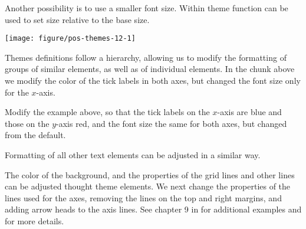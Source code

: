 \documentclass[krantz2]{krantz}\usepackage{knitr}%
\begin{document}
Another possibility is to use a smaller font size. Within theme function  can be used to set size relative to the base size.

\begin{knitrout}\footnotesize
{}\color{fgcolor}\begin{kframe}
\begin{alltt}
  \hlopt{+}  \hlopt{+}
  \hlstd{()} \hlopt{+}
  \hlstd{(} \hlopt{::}\hlstd{(} \hlstd{=} \hlstd{))} \hlopt{+}
  \hlstd{(} \hlstd{=} \hlstd{(} \hlstd{=} \hlstd{),}
         \hlstd{=} \hlstd{(} \hlstd{=} \hlstd{(}\hlstd{)))}
\end{alltt}
\end{kframe}

{\centering \texttt{[image: figure/pos-themes-12-1]} 

}



\end{knitrout}

Themes definitions follow a hierarchy, allowing us to modify the formatting of groups of similar elements, as well as of individual elements. In the chunk above we modify the color of the tick labels in both axes, but changed the font size only for the $x$-axis.

\begin{playground}
Modify the example above, so that the tick labels on the $x$-axis are blue and those on the $y$-axis red, and the font size the same for both axes, but changed from the default.
\end{playground}

Formatting of all other text elements can be adjusted in a similar way.

The color of the background, and the properties of the grid lines and other lines can be adjusted thought theme elements. We next change the properties of the lines used for the axes, removing the lines on the top and right margins, and adding arrow heads to the axis lines. See chapter 9 in  \autocite{Wickham2016} for additional examples and  \autocite{Chang2013} for more details.
\end{document}
